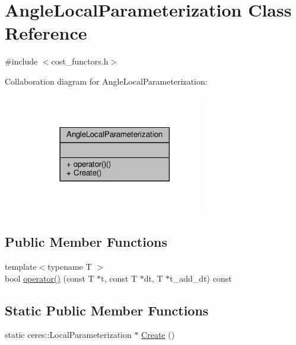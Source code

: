 \hypertarget{classAngleLocalParameterization}{}\section{Angle\+Local\+Parameterization Class Reference}
\label{classAngleLocalParameterization}


{\ttfamily \#include $<$cost\+\_\+functors.\+h$>$}



Collaboration diagram for Angle\+Local\+Parameterization\+:\nopagebreak
\begin{figure}[H]
\begin{center}
\leavevmode
\includegraphics[width=218pt]{d4/da6/classAngleLocalParameterization__coll__graph}
\end{center}
\end{figure}
\subsection*{Public Member Functions}
\begin{DoxyCompactItemize}
\item 
{\footnotesize template$<$typename T $>$ }\\bool \hyperlink{classAngleLocalParameterization_a4395ea0db2ce1f4155d6a75931fcdff1}{operator()} (const T $\ast$t, const T $\ast$dt, T $\ast$t\+\_\+add\+\_\+dt) const
\end{DoxyCompactItemize}
\subsection*{Static Public Member Functions}
\begin{DoxyCompactItemize}
\item 
static ceres\+::\+Local\+Parameterization $\ast$ \hyperlink{classAngleLocalParameterization_a73006f5f3280d4adccfa3612f8188868}{Create} ()
\end{DoxyCompactItemize}


